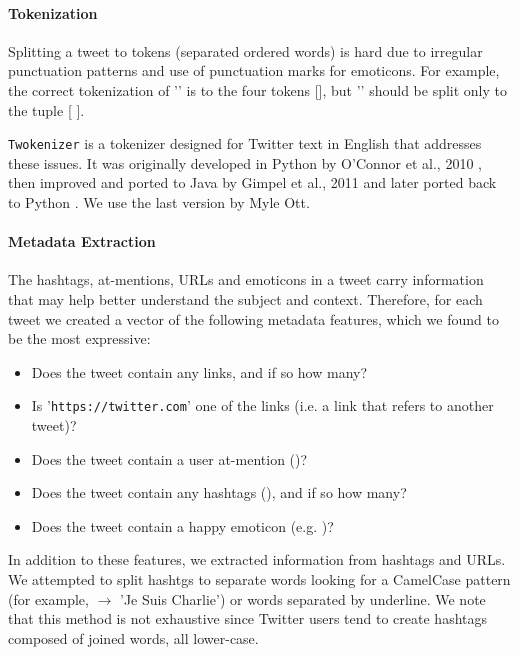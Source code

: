 \documentclass[letterpaper,twocolumn,10pt]{article}
\begin{document}
\paragraph{Tokenization}
Splitting a tweet to tokens (separated ordered words) is hard due to irregular punctuation patterns and use of punctuation marks for emoticons. For example, the correct tokenization of '' is to the four tokens [], but '' should be split only to the tuple [  ].

\texttt{Twokenizer} is a tokenizer designed for Twitter text in English that addresses these issues. It was originally developed in Python by O'Connor et al., 2010 \cite{TweetMotif}, then improved and ported to Java by Gimpel et al., 2011 \cite{POS-Tagging} and later ported back to Python \cite{ark-twokenize-py}. We use the last version by Myle Ott.

\paragraph{Metadata Extraction}
The hashtags, at-mentions, URLs and emoticons in a tweet carry information that may help better understand the subject and context. Therefore, for each tweet we created a vector of the following metadata features, which we found to be the most expressive:

\begin{itemize}[noitemsep, nolistsep]
	\item Does the tweet contain any links, and if so how many?
	\item Is '\texttt{https://twitter.com}' one of the links (i.e. a link that refers to another tweet)?
	\item Does the tweet contain a user at-mention ()?
	\item Does the tweet contain any hashtags (\tweet{\#}), and if so how many?
	\item Does the tweet contain a happy emoticon (e.g. )?
\end{itemize}

In addition to these features, we extracted information from hashtags and URLs. We attempted to split hashtgs to separate words
looking for a CamelCase pattern (for example,  $\rightarrow$ 'Je Suis Charlie') or words separated by underline. We note that this method is not exhaustive since Twitter users tend to create hashtags composed of joined words, all lower-case.
\end{document}
